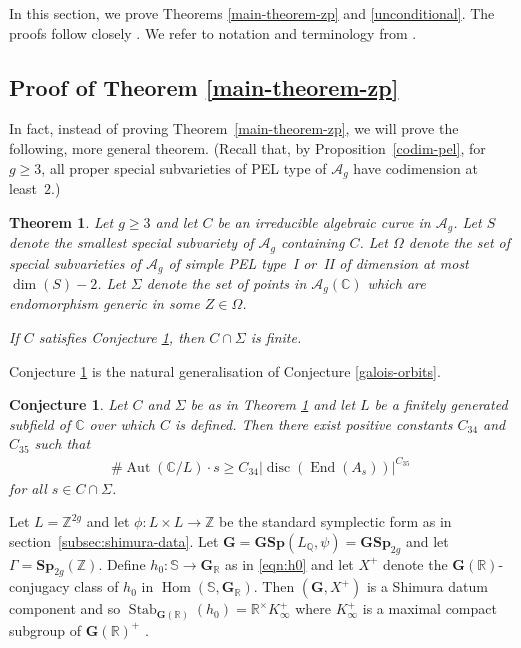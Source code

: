 \documentclass[JEP,XML,SOM,Unicode,NoFloatCountersInSection]{cedram}
\newcommand{\bC}{\mathbb{C}}
\newcommand{\bQ}{\mathbb{Q}}
\newcommand{\bR}{\mathbb{R}}
\newcommand{\bS}{\mathbb{S}}
\newcommand{\bZ}{\mathbb{Z}}
\newcommand{\cA}{\mathcal{A}}
\newcommand{\gG}{\mathbf{G}}
\newcommand{\gGSp}{\mathbf{GSp}}
\newcommand{\gSp}{\mathbf{Sp}}
\DeclareMathOperator{\Aut}{Aut}
\DeclareMathOperator{\disc}{disc}
\DeclareMathOperator{\End}{End}
\DeclareMathOperator{\Hom}{Hom}
\DeclareMathOperator{\Stab}{Stab}
\newtheorem{theorem}[lemma]{Theorem}
\newtheorem{conjecture}[lemma]{Conjecture}
\begin{document}
In this section, we prove Theorems \ref{main-theorem-zp} and \ref{unconditional}. The proofs follow closely \hbox{\cite[\S6]{QRTUI}}. We refer to notation and terminology from \cite[\S2.2 and 2.4]{Orr18}.

\subsection{Proof of Theorem \ref{main-theorem-zp}}

In fact, instead of proving Theorem~\ref{main-theorem-zp}, we will prove the following, more general theorem. (Recall that, by Proposition~\ref{codim-pel}, for $g\geq 3$, all proper special subvarieties of PEL type of $\cA_g$ have codimension at least~$2$.)

\begin{theorem}\label{ZP-end}
Let $g\geq 3$ and let $C$ be an irreducible algebraic curve in $\cA_g$. Let $S$ denote the smallest special subvariety of $\cA_g$ containing $C$.
Let $\Omega$ denote the set of special subvarieties of $\cA_g$ of simple PEL type~I or~II of dimension at most $\dim(S)-2$. Let $\Sigma$ denote the set of points in $\cA_g(\bC)$ which are endomorphism generic in some $Z\in\Omega$.

If $C$ satisfies Conjecture \ref{LGO-general}, then $C\cap\Sigma$ is finite.
\end{theorem}

Conjecture \ref{LGO-general} is the natural generalisation of Conjecture \ref{galois-orbits}.

\begin{conjecture}\label{LGO-general}
Let $C$ and $\Sigma$ be as in Theorem \ref{ZP-end} and let $L$ be a finitely generated subfield of $\bC$ over which $C$ is defined.
Then there exist positive constants $C_{34}$ and $C_{35}$ such that
\begin{align*}
\#\Aut(\bC/L)\cdot s\geq C_{34}|\disc(\End(A_s))|^{C_{35}}
\end{align*}
for all $s\in C\cap\Sigma$.
\end{conjecture}

Let $L=\bZ^{2g}$ and let $\phi:L\times L\to\bZ$ be the standard symplectic form as in section~\ref{subsec:shimura-data}.
Let $\gG=\gGSp(L_\bQ, \psi)=\gGSp_{2g}$ and let $\Gamma=\gSp_{2g}(\bZ)$.
Define $h_0 \colon \mathbb{S}\to\gG_\bR$ as in \eqref{eqn:h0} and let $X^+$ denote the $\gG(\bR)$-conjugacy class of $h_0$ in $\Hom(\bS, \gG_\bR)$.
Then $(\gG, X^+)$ is a Shimura datum component and so $\Stab_{\gG(\bR)}(h_0) = \bR^\times K^+_\infty$ where $K^+_\infty$ is a maximal compact subgroup of $\gG(\bR)^+$ \cite[Chap.\,6]{Mil05}.
\end{document}
